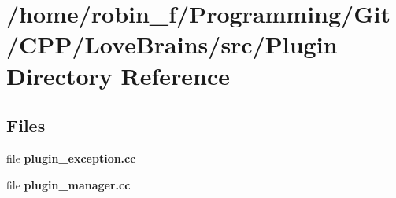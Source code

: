 \section{/home/robin\+\_\+f/\+Programming/\+Git/\+C\+P\+P/\+Love\+Brains/src/\+Plugin Directory Reference}
\label{dir_ba07b98b73e74fa22bb528389828e55c}
\subsection*{Files}
\begin{DoxyCompactItemize}
\item 
file {\bfseries plugin\+\_\+exception.\+cc}
\item 
file {\bfseries plugin\+\_\+manager.\+cc}
\end{DoxyCompactItemize}
